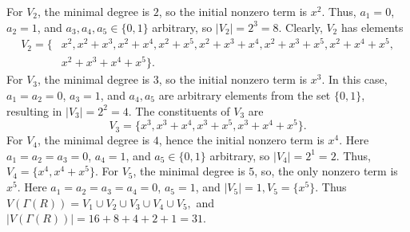 \documentclass[12pt,twoside]{article}
\begin{document}
 For $V_2$, the minimal degree is $2$, so the initial nonzero term is $x^2$.	Thus, $a_1 = 0$, $a_2 = 1$, and $a_3,a_4,a_5 \in \{0,1\}$ arbitrary, so $|V_2| = 2^3 = 8.$ Clearly, $V_{2}$ has elements
 \begin{align*}
 	V_2 = \{& x^2, 	x^2 + x^3, x^2 + x^4, 	x^2 + x^5,x^2 + x^3 + x^4, x^2 + x^3 + x^5, x^2 + x^4 + x^5,\\
 	&x^2 + x^3 + x^4 + x^5 	\}.
 \end{align*}
 For	$V_3$, the minimal degree is $3$, so  the initial nonzero term is $x^3$.	In this case, $a_1 = a_2 = 0$, $a_3 = 1$, and $a_4, a_5$ are arbitrary elements from the set $\{0,1\}$, resulting in $|V_3| = 2^2 = 4.$ The constituents of \( V_{3} \) are \[ V_3 = \{ x^3, x^3 + x^4, x^3 + x^5, x^3 + x^4 + x^5 \}. \]
 For $V_4$, the minimal degree is $4$, hence the initial nonzero term is $x^4$.  Here $a_1 = a_2 = a_3 = 0$, $a_4 = 1$, and $a_5 \in \{0,1\}$ arbitrary, so $|V_4| = 2^1 = 2.$ Thus, $V_4 = \{x^4, x^4 + x^5\}.$ For $V_5$, the minimal degree is $5$, so, the only nonzero term is $x^5$. 	Here $a_1 = a_2 = a_3 = a_4 = 0$, $a_5 = 1$,  and $|V_5| = 1, V_5 = \{x^5\}.$ Thus $V( \varGamma(R)) = V_1 \cup V_2 \cup V_3 \cup V_4 \cup V_5,$ and  $|V( \varGamma(R))|=16 + 8 + 4 + 2 + 1 = 31.$
 
\end{document}
